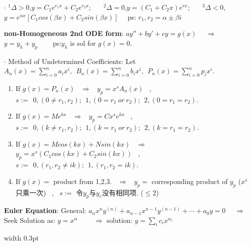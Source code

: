 \documentclass[8pt]{extarticle}
\begin{document}
\begin{minipage}[t]{0.6\textwidth}
$\cdot$ { $^1\Delta>0$,$y=C_1e^{r_1x}+C_2e^{r_2x}$; \ \ \ $^2\Delta=0$,$y=(C_1+C_2x)e^{rx}$; \ \ \ $^3\Delta<0$,$y=e^{\alpha x}[C_1cos(\beta x)+C_2sin(\beta x)]$ \ \ ps: $r_1,r_2 = \alpha\pm\beta i$}

\textbf{non-Homogeneous 2nd ODE form}: $ay''+by'+cy=g(x)$ \ \ $\Rightarrow$ \ \ $y=y_h+y_p$ \ \ \ { ps:$y_h$ is sol for $g(x)=0$.}

$\cdot$ { Method of Undetermined Coefficients: Let $A_n(x)=\sum_{i=0}^{n}a_ix^i, \ \ B_n(x)=\sum_{i=0}^{n}b_ix^i, \ \ P_n(x)=\sum_{i=0}^{n}p_ix^i$.}

{

\begin{enumerate}[itemsep=-2pt, topsep=-2pt]
   \item If $g(x)=P_n(x)$ \ $\Rightarrow$ \ $y_p=x^sA_n(x)$ \ , $s:= \ \ 0,(0\ne r_1,r_2); \ \ 1,(0 = r_1 \ or \ r_2); \ \ 2,(0 = r_1 = r_2).$
   \item If $g(x)=Me^{kx}$ \ $\Rightarrow$ \ $y_p=Cx^se^{kx}$ \ , $s:= \ \ 0,(k\ne r_1,r_2); \ \ 1,(k = r_1 \ or \ r_2); \ \ 2,(k = r_1 = r_2).$
   \item If $g(x)=Mcos(kx)+Nsin(kx)$ \ $\Rightarrow$ \ $y_p=x^s(C_1cos(kx)+C_2sin(kx))$ \ , $s:= \ \ 0,(r_1,r_2 \ne ik); \ \ 1,(r_1,r_2= ik).$
   \item If $g(x)=$ product from 1,2,3. \ $\Rightarrow$ \ $y_p=$ corresponding product of $y_p$ ($x^s$ 只乘一次) \ , \ $s:=$ 令$y_p$与$y_c$没有相同项. ($\leq 2$)
\end{enumerate}
}

\textbf{Euler Equation}: General: $a_nx^ny^{(n)}+a_{n-1}x^{n-1}y^{(n-1)}+\cdots+a_0y=0$ \ \ $\Rightarrow$ Seek Solution as: $y=x^\alpha$ \ \ \ \ $\Rightarrow$ solution: $y=\sum_ic_ix^{\alpha_i}$

\end{minipage}
\hfill
\vrule width 0.3pt
\hfill
\end{document}
